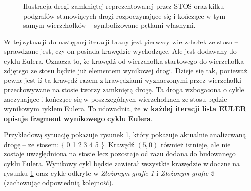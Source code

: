 \begin{figure}
\centering
{}
\label{RysDowodPoprawnosci}
\caption{Ilustracja drogi zamkniętej reprezentowanej przez STOS oraz kilku podgrafów stanowiących drogi rozpoczynające się i kończące w tym samym wierzchołków -- symbolizowane pętlami własnymi.}
\end{figure}

W tej sytuacji do następnej iteracji brany jest pierwszy wierzchołek ze stosu -- sprawdzane jest, czy on posiada krawędzie wychodzące. 
Ale jest dodawany do cyklu Eulera. Oznacza to, że krawędź od wierzchołka startowego do wierzchołka zdjętego ze stosu będzie już elementem wynikowej drogi.
Dzieje się tak, ponieważ pewne jest iż ta krawędź razem z krawędziami wyznaczonymi przez wierzchołki przechowywane na stosie tworzy zamkniętą drogę. 
Ta droga wzbogacona o cykle zaczynające i kończące się w poszczególnych wierzchołkach ze stosu będzie wynikowym cyklem Eulera.
To udowadnia, że \textbf{w każdej iteracji lista EULER opisuje fragment wynikowego cyklu Eulera}.

Przykładową sytuację pokazuje rysunek \ref{RysDowodPoprawnosci}, który pokazuje aktualnie analizowaną drogę -- ze stosem: $\lbrace $ 0 1 2 3 4 5 $\rbrace $. Krawędź $(5, 0)$ również istnieje, ale nie zostaje uwzględniona na stosie lecz pozostaje od razu dodana do budowanego cyklu Eulera. Wynikowy cykl będzie zawierał wszystkie krawędzie widoczne na rysunku \ref{RysDowodPoprawnosci} oraz cykle odkryte w \textit{Złożonym grafie 1} i \textit{Złożonym grafie 2} (zachowując odpowiednią kolejność).

